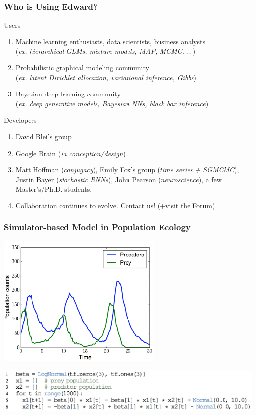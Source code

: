 \documentclass[10pt,
               xcolor={usenames,dvipsnames},
               hyperref={colorlinks,linktoc=all,citecolor=Plum,linkcolor=MidnightBlue,urlcolor=MidnightBlue},noamssymb]{beamer}
\begin{document}
\begin{frame}
\frametitle{Who is Using Edward?}
{\large Users}
\begin{enumerate}
\item
Machine learning enthusiasts, data scientists, business analysts \\
(\emph{ex. hierarchical GLMs, mixture models, MAP, MCMC, ...})
\item
Probabilistic graphical modeling community \\
(\emph{ex. latent Dirichlet allocation, variational inference, Gibbs})
\item
Bayesian deep learning community \\
(\emph{ex. deep generative models, Bayesian NNs, black box inference})
\end{enumerate}

{\large Developers}
\begin{enumerate}
\item
David Blei's group
\item
Google Brain
(\emph{in conception/design})
\item
Matt Hoffman (\emph{conjugacy}),
Emily Fox's group
(\emph{time series + SGMCMC}),
Justin Bayer (\emph{stochastic RNNs}),
John Pearson (\emph{neuroscience}),
a few Master's/Ph.D. students.
\item
Collaboration continues to evolve. Contact us! (+visit the Forum)
\end{enumerate}
\end{frame}

\begin{frame}[plain,t]
\frametitle{Simulator-based Model in Population Ecology}
\begin{center}
\includegraphics[width=0.6\textwidth]{img/lotka_volterra_plot.png}
\end{center}

\begin{center}
\includegraphics[width=1.0\textwidth]{img/lotka_volterra_program.png}
\end{center}
\end{frame}
\end{document}
